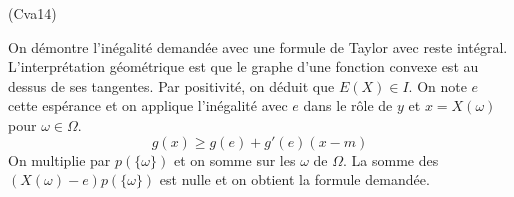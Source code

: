 \begin{tiny}(Cva14)\end{tiny} On démontre l'inégalité demandée avec une formule de Taylor avec reste intégral.\newline
 L'interprétation géométrique est que le graphe d'une fonction convexe est au dessus de ses tangentes.\newline
Par positivité, on déduit que $E(X)\in I$. On note $e$ cette espérance et on applique l'inégalité avec $e$ dans le rôle de $y$ et  $x=X(\omega)$ pour $\omega\in \Omega$.
\begin{displaymath}
 g(x)\geq g(e)+g'(e)(x-m)
\end{displaymath}
On multiplie par $p(\{\omega\})$ et on somme sur les $\omega$ de $\Omega$. La somme des $(X(\omega)-e)p(\{\omega\})$ est nulle et on obtient la formule demandée.